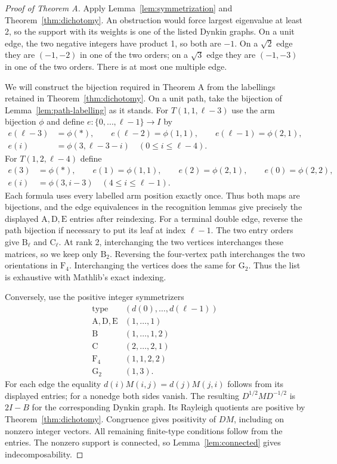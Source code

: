 \documentclass[11pt]{amsart}
\theoremstyle{definition}
\newcommand{\typ}[1]{\mathrm{#1}}
\begin{document}
\begin{proof}[Proof of Theorem A]
Apply Lemma~\ref{lem:symmetrization} and Theorem~\ref{thm:dichotomy}.
An obstruction would force largest eigenvalue at least 2, so the support
with its weights is one of the listed Dynkin graphs.
On a unit edge, the two negative integers have product 1, so both are $-1$.
On a $\sqrt2$ edge they are $(-1,-2)$ in one of the two orders; on a
$\sqrt3$ edge they are $(-1,-3)$ in one of the two orders.
There is at most one multiple edge.

We will construct the bijection required in Theorem A from the
labellings retained in Theorem~\ref{thm:dichotomy}. On a unit path,
take the bijection of Lemma~\ref{lem:path-labelling} as it stands.
For $T(1,1,\ell-3)$ use the arm bijection $\phi$ and define
$e:\{0,\ldots,\ell-1\}\to I$ by
\[
 \begin{split}
 e(\ell-3)&=\phi(*),\qquad
 e(\ell-2)=\phi(1,1),\qquad e(\ell-1)=\phi(2,1),\\
 e(i)&=\phi(3,\ell-3-i)\quad(0\leq i\leq\ell-4).
 \end{split}
\]
For $T(1,2,\ell-4)$ define
\[
 \begin{split}
 e(3)&=\phi(*),\qquad e(1)=\phi(1,1),\qquad
 e(2)=\phi(2,1),\qquad e(0)=\phi(2,2),\\
 e(i)&=\phi(3,i-3)\quad(4\leq i\leq\ell-1).
 \end{split}
\]
Each formula uses every labelled arm position exactly once. Thus both
maps are bijections, and the edge equivalences in the recognition
lemmas give precisely the displayed $\typ A,\typ D,\typ E$ entries
after reindexing. For a terminal double edge, reverse the path
bijection if necessary to put its leaf at index $\ell-1$.
The two entry orders give
$\typ B_\ell$ and $\typ C_\ell$. At rank 2, interchanging the two
vertices interchanges these matrices, so we keep only $\typ B_2$.
Reversing the four-vertex path interchanges the two orientations in
$\typ F_4$. Interchanging the vertices does the same for $\typ G_2$.
Thus the list is exhaustive with Mathlib's exact indexing.

Conversely, use the positive integer symmetrizers
\begin{equation}\label{eq:symmetrizers}
\begin{array}{c|c}
\text{type}&(d(0),\ldots,d(\ell-1))\\ \hline
\typ A,\typ D,\typ E&(1,\ldots,1)\\
\typ B&(1,\ldots,1,2)\\
\typ C&(2,\ldots,2,1)\\
\typ F_4&(1,1,2,2)\\
\typ G_2&(1,3).
\end{array}
\end{equation}
For each edge the equality $d(i)M(i,j)=d(j)M(j,i)$ follows from its
displayed entries; for a nonedge both sides vanish. The resulting
$D^{1/2}MD^{-1/2}$ is $2I-B$ for the corresponding Dynkin graph.
Its Rayleigh quotients are positive by Theorem~\ref{thm:dichotomy}.
Congruence gives positivity of $DM$, including on nonzero integer vectors.
All remaining finite-type conditions follow from the entries. The
nonzero support is connected, so Lemma~\ref{lem:connected} gives
indecomposability.


\end{proof}
\end{document}
